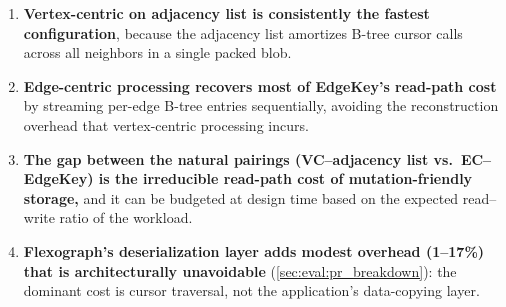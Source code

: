 \begin{enumerate}
  \item \textbf{Vertex-centric on adjacency list is consistently the fastest configuration}, because the adjacency list amortizes B-tree cursor calls across all neighbors in a single packed blob.

  \item \textbf{Edge-centric processing recovers most of EdgeKey's read-path cost} by streaming per-edge B-tree entries sequentially, avoiding the reconstruction overhead that vertex-centric processing incurs.

  \item \textbf{The gap between the natural pairings (VC--adjacency list vs.\ EC--EdgeKey) is the irreducible read-path cost of mutation-friendly storage,} and it can be budgeted at design time based on the expected read--write ratio of the workload.
  
  \item \textbf{Flexograph's deserialization layer adds modest overhead (1--17\%) that is architecturally unavoidable} (\autoref{sec:eval:pr_breakdown}): the dominant cost is \wt{} cursor traversal, not the application's data-copying layer.
\end{enumerate}

